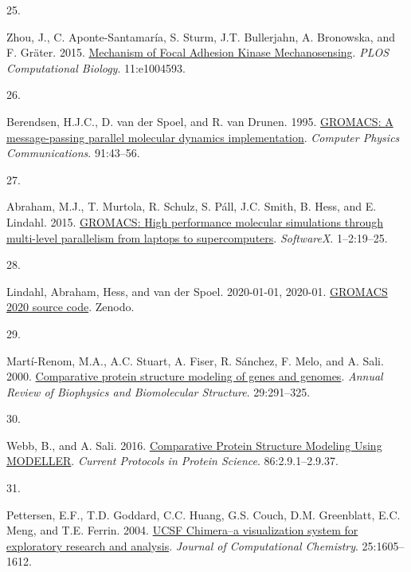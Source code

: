 \documentclass[
  letterpaper,
  DIV=11,
  numbers=noendperiod]{scrartcl}
\newlength{\cslhangindent}
\newlength{\csllabelwidth}
\newlength{\cslentryspacingunit} %
\newenvironment{CSLReferences}[2] %
 {%
  \setlength{\parindent}{0pt}
  \ifodd #1
  \let\oldpar\par
  \def\par{\hangindent=\cslhangindent\oldpar}
  \fi
  \setlength{\parskip}{#2\cslentryspacingunit}
 }%
 {}
\newcommand{\CSLLeftMargin}[1]{\parbox[t]{\csllabelwidth}{#1}}
\newcommand{\CSLRightInline}[1]{\parbox[t]{\linewidth - \csllabelwidth}{#1}\break}
\begin{document}
\begin{CSLReferences}{0}{0}
\leavevmode{}%
\CSLLeftMargin{25. }%
\CSLRightInline{Zhou, J., C. Aponte-Santamaría, S. Sturm, J.T.
Bullerjahn, A. Bronowska, and F. Gräter. 2015.
\href{https://doi.org/10.1371/journal.pcbi.1004593}{Mechanism of {Focal
Adhesion Kinase Mechanosensing}}. \emph{PLOS Computational Biology}.
11:e1004593.}

\leavevmode{}%
\CSLLeftMargin{26. }%
\CSLRightInline{Berendsen, H.J.C., D. van der Spoel, and R. van Drunen.
1995. \href{https://doi.org/10.1016/0010-4655(95)00042-E}{{GROMACS}: {A}
message-passing parallel molecular dynamics implementation}.
\emph{Computer Physics Communications}. 91:43--56.}

\leavevmode{}%
\CSLLeftMargin{27. }%
\CSLRightInline{Abraham, M.J., T. Murtola, R. Schulz, S. Páll, J.C.
Smith, B. Hess, and E. Lindahl. 2015.
\href{https://doi.org/10.1016/j.softx.2015.06.001}{{GROMACS}: {High}
performance molecular simulations through multi-level parallelism from
laptops to supercomputers}. \emph{SoftwareX}. 1--2:19--25.}

\leavevmode{}%
\CSLLeftMargin{28. }%
\CSLRightInline{Lindahl, Abraham, Hess, and van der Spoel. 2020-01-01,
2020-01. \href{https://doi.org/10.5281/zenodo.3562495}{{GROMACS} 2020
source code}. {Zenodo}.}

\leavevmode{}%
\CSLLeftMargin{29. }%
\CSLRightInline{Martí-Renom, M.A., A.C. Stuart, A. Fiser, R. Sánchez, F.
Melo, and A. Sali. 2000.
\href{https://doi.org/10.1146/annurev.biophys.29.1.291}{Comparative
protein structure modeling of genes and genomes}. \emph{Annual Review of
Biophysics and Biomolecular Structure}. 29:291--325.}

\leavevmode{}%
\CSLLeftMargin{30. }%
\CSLRightInline{Webb, B., and A. Sali. 2016.
\href{https://doi.org/10.1002/cpps.20}{Comparative {Protein Structure
Modeling Using MODELLER}}. \emph{Current Protocols in Protein Science}.
86:2.9.1--2.9.37.}

\leavevmode{}%
\CSLLeftMargin{31. }%
\CSLRightInline{Pettersen, E.F., T.D. Goddard, C.C. Huang, G.S. Couch,
D.M. Greenblatt, E.C. Meng, and T.E. Ferrin. 2004.
\href{https://doi.org/10.1002/jcc.20084}{{UCSF Chimera--a} visualization
system for exploratory research and analysis}. \emph{Journal of
Computational Chemistry}. 25:1605--1612.}


\end{CSLReferences}
\end{document}
